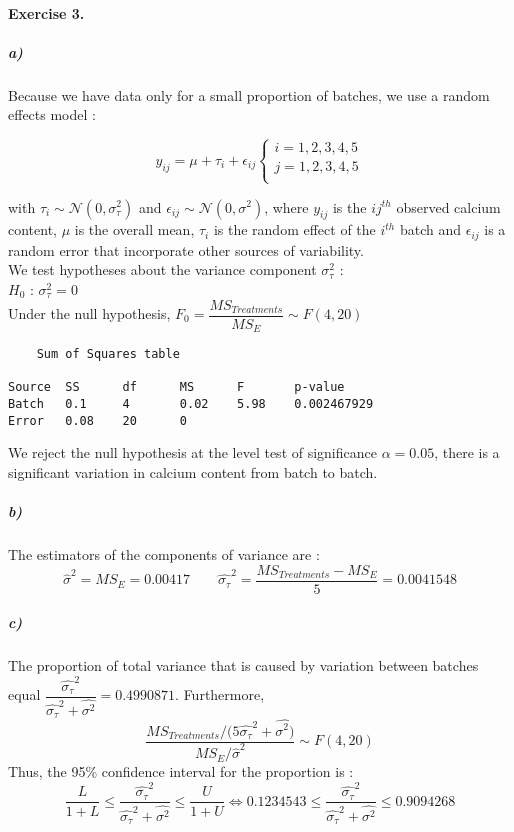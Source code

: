 \documentclass{article}
\begin{document}
\paragraph{Exercise 3.}
\subparagraph{a)}
Because we have data only for a small proportion of batches, we use a random effects model : 
\begin{center}
$$
y_{ij}=\mu +\tau_i +\epsilon_{ij} \left \{
    \begin{array}{ll}
        i=1,2,3,4,5 \\
		j=1,2,3,4,5 \\
    \end{array}
\right.
$$
\end{center}
with $\tau_{i} \sim \mathcal{N}(0,\sigma_{\tau}^2)$ and $\epsilon_{ij} \sim \mathcal{N}(0,\sigma^2)$,
 where $y_{ij}$ is the $ij^{th}$ observed calcium content, $\mu$ is the overall mean, $\tau_i$ is the random effect of the $i^{th}$ batch and $\epsilon_{ij}$ is a random error that incorporate other sources of variability.\\
We test hypotheses about the variance component $\sigma_{\tau}^2$ : \\
$H_0$ : $\sigma_{\tau}^2=0$\\
Under the null hypothesis, $F_0=\dfrac{MS_{Treatments}}{MS_E} \sim F(4,20) $
\begin{verbatim}
	Sum of Squares table
	
Source  SS      df      MS      F       p-value
Batch   0.1     4       0.02    5.98    0.002467929     
Error   0.08    20      0                              
\end{verbatim}
We reject the null hypothesis at the level test of significance $\alpha=0.05$, there is a significant variation in calcium content from batch to batch.
\subparagraph{b)}
The estimators of the components of variance are :\\
$$\widehat{\sigma}^2=MS_E=0.00417 \qquad \widehat{\sigma_{\tau}}^2=\dfrac{MS_{Treatments}-MS_E}{5}=0.0041548$$
\subparagraph{c)}
The proportion of total variance that is caused by variation between batches equal $\dfrac{\widehat{\sigma_{\tau}}^2}{\widehat{\sigma_{\tau}}^2+\widehat{\sigma^2}}=0.4990871$.
Furthermore, \\
$$\dfrac{MS_{Treatments}/(5\widehat{\sigma_{\tau}}^2+ \widehat{\sigma^2)}}{MS_E/ \widehat{\sigma}^2} \sim F(4,20)$$
Thus, the 95\% confidence interval for the proportion is : \\
$$\dfrac{L}{1+L} \leq \dfrac{\widehat{\sigma_{\tau}}^2}{\widehat{\sigma_{\tau}}^2+\widehat{\sigma^2}} \leq \dfrac{U}{1+U} \iff 
0.1234543 \leq \dfrac{\widehat{\sigma_{\tau}}^2}{\widehat{\sigma_{\tau}}^2+\widehat{\sigma^2}} \leq 0.9094268 $$
\end{document}
